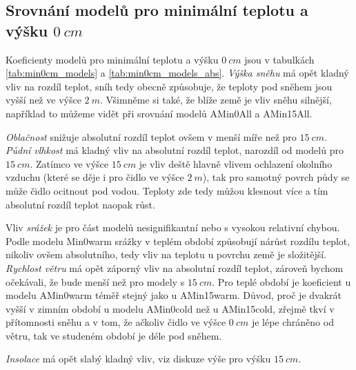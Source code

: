 \subsection{Srovnání modelů pro minimální teplotu a výšku $\SI{0}{cm}$}
Koeficienty modelů pro minimální teplotu a výšku $\SI{0}{cm}$ jsou v tabulkách \ref{tab:min0cm_models} a \ref{tab:min0cm_models_abs}. \textit{Výška sněhu} má opět kladný vliv na rozdíl teplot, sníh tedy obecně způsobuje, že teploty pod sněhem jsou vyšší než ve výšce $\SI{2}{m}$. Všimněme si také, že blíže země je vliv sněhu silnější, například to můžeme vidět při srovnání modelů AMin0All a AMin15All.

\textit{Oblačnost} snižuje absolutní rozdíl teplot ovšem v menší míře než pro $\SI{15}{cm}$. \textit{Půdní vlhkost} má kladný vliv na absolutní rozdíl teplot, narozdíl od modelů pro $\SI{15}{cm}$. Zatímco ve výšce $\SI{15}{cm}$ je vliv deště hlavně vlivem ochlazení okolního vzduchu (které se děje i pro čidlo ve výšce $\SI{2}{m}$), tak pro samotný povrch půdy se může čidlo ocitnout pod vodou. Teploty zde tedy můžou klesnout více a tím absolutní rozdíl teplot naopak růst.

Vliv \textit{srážek} je pro část modelů nesignifikantní nebo s vysokou relativní chybou. Podle modelu Min0warm srážky v teplém období způsobují nárůst rozdílu teplot, nikoliv ovšem absolutního, tedy vliv na teplotu u povrchu země je složitější. \textit{Rychlost větru} má opět záporný vliv na absolutní rozdíl teplot, zároveň bychom očekávali, že bude menší než pro modely s $\SI{15}{cm}$. Pro teplé období je koeficient u modelu AMin0warm téměř stejný jako u AMin15warm. Důvod, proč je dvakrát vyšší v zimním období u modelu AMin0cold než u AMin15cold, zřejmě tkví v přítomnosti sněhu a v tom, že ačkoliv čidlo ve výšce $\SI{0}{cm}$ je lépe chráněno od větru, tak ve studeném období je déle pod sněhem. 

\textit{Insolace} má opět slabý kladný vliv, viz diskuze výše pro výšku $\SI{15}{cm}$.

